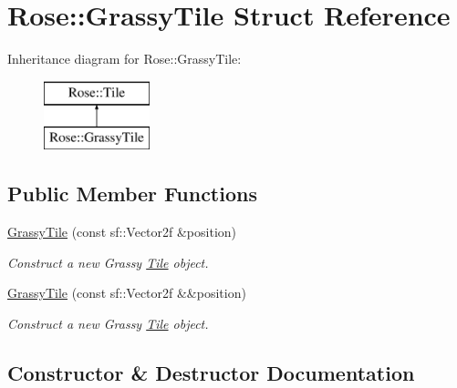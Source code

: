 \hypertarget{structRose_1_1GrassyTile}{}\section{Rose\+::Grassy\+Tile Struct Reference}
\label{structRose_1_1GrassyTile}
Inheritance diagram for Rose\+::Grassy\+Tile\+:\begin{figure}[H]
\begin{center}
\leavevmode
\includegraphics[height=2.000000cm]{structRose_1_1GrassyTile}
\end{center}
\end{figure}
\subsection*{Public Member Functions}
\begin{DoxyCompactItemize}
\item 
\mbox{\hyperlink{structRose_1_1GrassyTile_af97dac68cb91fc462274d16d85e20e92}{Grassy\+Tile}} (const sf\+::\+Vector2f \&position)
\begin{DoxyCompactList}\small\item\em Construct a new Grassy \mbox{\hyperlink{classRose_1_1Tile}{Tile}} object. \end{DoxyCompactList}\item 
\mbox{\hyperlink{structRose_1_1GrassyTile_acd1aa8c780a09b87e0bb4b39a435c536}{Grassy\+Tile}} (const sf\+::\+Vector2f \&\&position)
\begin{DoxyCompactList}\small\item\em Construct a new Grassy \mbox{\hyperlink{classRose_1_1Tile}{Tile}} object. \end{DoxyCompactList}\end{DoxyCompactItemize}


\subsection{Constructor \& Destructor Documentation}
\mbox{\label{structRose_1_1GrassyTile_af97dac68cb91fc462274d16d85e20e92}} 
